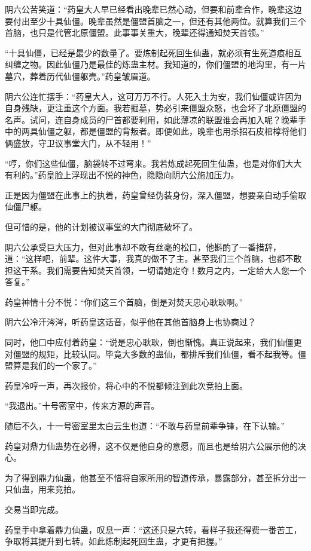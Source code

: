 \begin{this_body}
阴六公苦笑道：“药皇大人早已经看出晚辈已然心动，但要和前辈合作，晚辈这边要付出至少十具仙僵。晚辈虽然是僵盟首脑之一，但还有其他两位。就算我们三个首脑，也只是代管北原僵盟。此事事关重大，晚辈还得通知焚天首领。”

“十具仙僵，已经是最少的数量了。要炼制起死回生仙蛊，就必须有生死道痕相互纠缠之物。因此仙僵乃是最佳的炼蛊主材。我知道的，你们僵盟的地沟里，有一片墓穴，葬着历代仙僵躯壳。”药皇皱眉道。

阴六公连忙摆手：“药皇大人，这可万万不行。人死入土为安，我们仙僵或许因为自身残缺，更注重这个方面。我若掘墓，势必引来僵盟众怒，也会坏了北原僵盟的名声。试问，连自身成员的尸首都要利用，如此薄凉的联盟谁会再加入呢？晚辈手中的两具仙僵之躯，都是僵盟的背叛者。即便如此，晚辈也用杀招石皮棺椁将他们俩盛放，守卫议事堂大门，从不轻用！”

“哼，你们这些仙僵，脑袋转不过弯来。我若炼成起死回生仙蛊，也是对你们大大有利的。”药皇脸上浮现出不悦的神色，隐隐向阴六公施加压力。

正是因为僵盟在此事上的执着，药皇曾经伪装身份，深入僵盟，想要亲自动手偷取仙僵尸躯。

但可惜的是，他的计划被议事堂的大门彻底破坏了。

阴六公承受巨大压力，但对此事却不敢有丝毫的松口，他斟酌了一番措辞，道：“这样吧，前辈。这件大事，我真的做不了主。甚至我们三个首脑，也都不敢担这干系。我们需要告知焚天首领，一切请她定夺！数月之内，一定给大人您一个答复。”

药皇神情十分不悦：“你们这三个首脑，倒是对焚天忠心耿耿啊。”

阴六公冷汗涔涔，听药皇这话音，似乎他在其他首脑身上也协商过？

同时，他口中应付着药皇：“说是忠心耿耿，倒也惭愧。真正说起来，我们仙僵更对僵盟的规矩，比较认同。毕竟大多数的蛊仙，都排斥我们仙僵，看不起我等。僵盟算是我们的一个家了。”

药皇冷哼一声，再次报价，将心中的不悦都倾注到此次竞拍上面。

“我退出。”十号密室中，传来方源的声音。

随后不久，十一号密室里太白云生也道：“不敢与药皇前辈争锋，在下认输。”

药皇对鼎力仙蛊势在必得，这不仅是他自身的意愿，而且也是给阴六公展示他的决心。

为了得到鼎力仙蛊，他甚至不惜将自家所用的智道传承，暴露部分，甚至拆分出一只仙蛊，用来竞拍。

交易当即完成。

药皇手中拿着鼎力仙蛊，叹息一声：“这还只是六转，看样子我还得费一番苦工，争取将其提升到七转。如此炼制起死回生蛊，才更有把握。”


\end{this_body}
